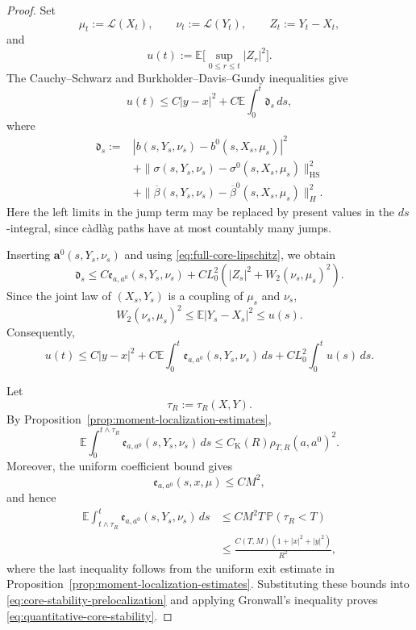 \documentclass[12pt,oneside, reqno]{amsart}
\numberwithin{equation}{section}
\begin{document}
	\begin{proof}
		Set
		\[
		\mu_t:=\mathcal L(X_t), \qquad	\nu_t:=\mathcal L(Y_t),
		\qquad	Z_t:=Y_t-X_t,
		\]
		and
		\[
		u(t):=	\mathbb E\big[\sup_{0\leq r\leq t}|Z_r|^2\big].
		\]
		The Cauchy--Schwarz and  Burkholder--Davis--Gundy inequalities give
		\[
		u(t)\leq C|y-x|^2+C\mathbb E\int_0^t\mathfrak d_s\,ds,
		\]
		where
		\[
		\begin{aligned}
			\mathfrak d_s
			:={}&|b(s,Y_s,\nu_s)-b^0(s,X_s,\mu_s)|^2\\
			&+\|\sigma(s,Y_s,\nu_s)-\sigma^0(s,X_s,\mu_s)\|_{\mathrm{HS}}^2\\
			&+\|\overline\beta(s,Y_s,\nu_s)-\overline\beta^0(s,X_s,\mu_s)\|_H^2.
		\end{aligned}
		\]
		Here the left limits in the jump term may be replaced by present
		values in the $ds$-integral, since c\`adl\`ag paths have at most
		countably many jumps.
		
		Inserting $\mathbf a^0(s,Y_s,\nu_s)$ and using
		\eqref{eq:full-core-lipschitz}, we obtain
		\[
		\mathfrak d_s\leq C\mathfrak e_{a,a^0}(s,Y_s,\nu_s)	+CL_0^2\left(|Z_s|^2+W_2(\nu_s,\mu_s)^2\right).
		\]
		Since the joint law of $(X_s,Y_s)$ is a coupling of
		$\mu_s$ and $\nu_s$,
		\[
		W_2(\nu_s,\mu_s)^2\leq\mathbb E|Y_s-X_s|^2\leq u(s).
		\]
		Consequently,
		\begin{equation}
			\label{eq:core-stability-prelocalization}
			u(t)
			\leq
			C|y-x|^2
			+
			C\mathbb E\int_0^t
			\mathfrak e_{a,a^0}(s,Y_s,\nu_s)\,ds
			+
			CL_0^2\int_0^tu(s)\,ds.
		\end{equation}
		
		Let
		\[
		\tau_R:=\tau_R(X,Y).
		\]
		By Proposition~\ref{prop:moment-localization-estimates},
		\[
		\mathbb E\int_0^{t\wedge\tau_R}
		\mathfrak e_{a,a^0}(s,Y_s,\nu_s)\,ds
		\leq
		C_{\mathrm K}(R)\rho_{T,R}(a,a^0)^2.
		\]
		Moreover, the uniform coefficient bound gives
		\[
		\mathfrak e_{a,a^0}(s,x,\mu)\leq CM^2,
		\]
		and hence
		\[
		\begin{aligned}
			\mathbb E\int_{t\wedge\tau_R}^{t}
			\mathfrak e_{a,a^0}(s,Y_s,\nu_s)\,ds
			&\leq
			CM^2T\,\mathbb P(\tau_R<T)
			\\
			&\leq
			\frac{C(T,M)(1+|x|^2+|y|^2)}{R^2},
		\end{aligned}
		\]
		where the last inequality follows from the uniform exit estimate in
		Proposition~\ref{prop:moment-localization-estimates}. Substituting these
		bounds into \eqref{eq:core-stability-prelocalization} and applying
		Gronwall's inequality proves
		\eqref{eq:quantitative-core-stability}.
	\end{proof}
	
\end{document}
